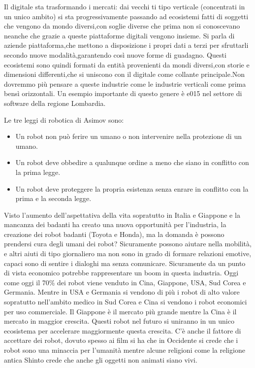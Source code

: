 \documentclass[a4page, 11pt]{article}
\begin{document}
Il digitale sta trasformando i mercati: dai vecchi
ti tipo verticale (concentrati in un unico ambito)
si sta progressivamente passando ad ecosistemi fatti di soggetti 
che vengono da mondo diversi,con soglie diverse che prima
non si conoscevano neanche che grazie a queste piattaforme digitali 
vengono insieme. Si parla di aziende piattaforma,che mettono a disposizione
i propri dati a terzi per sfruttarli secondo nuove modalità,garantendo così
nuove forme di guadagno. Questi ecosistemi sono quindi formati da entità
provenienti da mondi diversi,con storie e dimensioni differenti,che si uniscono
con il digitale come collante principale.Non dovremmo più pensare a queste
industrie come le industrie verticali come prima bensì orizzontali. Un
esempio importante di questo genere è e015 nel settore di software della
regione Lombardia.

Le tre leggi di robotica di Asimov sono:

\begin{itemize}
	 
	\item
	Un robot non può ferire un umano o non intervenire nella protezione di
	un umano.
	\item
	Un robot deve obbedire a qualunque ordine a meno che siano in
	conflitto con la prima legge.
	\item
	Un robot deve proteggere la propria esistenza senza enrare in
	conflitto con la prima e la seconda legge.
\end{itemize}

Visto l'aumento dell'aspettativa della vita sopratutto in Italia e
Giappone e la mancanza dei badanti ha creato una nuova opportunità per
l'industria, la creazione dei robot badanti (Toyota e Honda), ma la
domanda è possono prendersi cura degli umani dei robot? Sicuramente
possono aiutare nella mobilità, e altri aiuti di tipo giornaliero ma non
sono in grado di formare relazioni emotive, capaci sono di sentire i
dialoghi ma senza comunicare. Sicuramente da un punto di vista economico
potrebbe rappresentare un boom in questa industria. Oggi come oggi il
70\% dei robot viene venduto in Cina, Giappone, USA, Sud Corea e
Germania. Mentre in USA e Germania si vendono di più i robot di alto
valore sopratutto nell'ambito medico in Sud Corea e Cina si vendono i
robot economici per uso commerciale. Il Giappone è il mercato più grande
mentre la Cina è il mercato in maggior crescita. Questi robot nel futuro
si uniranno in un unico ecosistema per accelerare maggiormente questa
crescita. C'è anche il fattore di accettare dei robot, dovuto spesso ai
film si ha che in Occidente si crede che i robot sono una minaccia per
l'umanità mentre alcune religioni come la religione antica Shinto crede
che anche gli oggetti non animati siano vivi.
\end{document}
